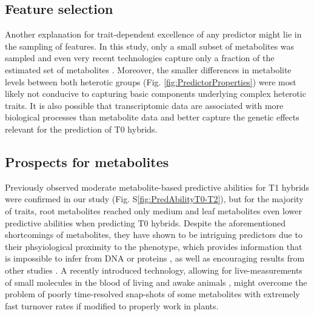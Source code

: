 \documentclass[12pt,titlepage]{article}
\begin{document}
\subsection{Feature selection}
Another explanation for trait-dependent excellence of any predictor might lie
in the sampling of features.
In this study, only a small subset of metabolites was sampled and even very 
recent technologies \cite{Xu2016,Dan2016} capture only a fraction of the 
estimated set of metabolites \cite{Fernie2007}.
Moreover, the smaller differences in metabolite levels between both heterotic 
groups (Fig. \ref{fig:PredictorProperties}) were most likely not conducive to
capturing basic components underlying complex heterotic traits.
It is also possible that transcriptomic data are associated with more
biological processes than metabolite data and better capture the genetic effects
relevant for the prediction of T0 hybrids.


\subsection{Prospects for metabolites}
Previously observed moderate metabolite-based predictive abilities for T1
hybrids \cite{Riedelsheimer2012b} were confirmed in our study
(Fig. S\ref{fig:PredAbilityT0-T2}), but for the majority of traits, root 
metabolites reached only medium and leaf metabolites even lower predictive 
abilities when predicting T0 hybrids.
Despite the aforementioned shortcomings of metabolites, they have shown to be 
intriguing predictors due to their phsyiological proximity to the phenotype,
which provides information that is impossible to infer from DNA or proteins
\cite{Fernie2012}, as well as encouraging results from other studies
\cite{Guo2016,Dan2016}.
A recently introduced technology, allowing for live-measurements of small 
molecules in the blood of living and awake animals \cite{Arroyo-Curras2017}, 
might overcome the problem of poorly time-resolved snap-shots of some 
metabolites with extremely fast turnover rates \cite{Arrivault2009} if modified
to properly work in plants.
\end{document}
